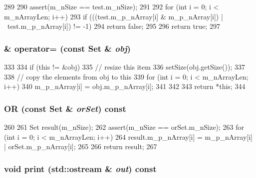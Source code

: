 \begin{DoxyCode}
289 {
290     assert(m_nSize == test.m_nSize);
291 
292     for (int i = 0; i < m_nArrayLen; i++)
293         if (((test.m_p_nArray[i] & m_p_nArray[i]) | ~test.m_p_nArray[i]) != -1)
294             return false;
295 
296     return true;
297 }
\end{DoxyCode}
\hypertarget{classSet_a274b72d7f852e6eb0e416c1d2e00c1ee}{
\subsubsection[{operator=}]{ \& operator= (const {\bf Set} \& {\em obj})}}
\label{classSet_a274b72d7f852e6eb0e416c1d2e00c1ee}



\begin{DoxyCode}
333 {
334     if (this != &obj) {
335         // resize this item
336         setSize(obj.getSize());
337 
338         // copy the elements from obj to this
339         for (int i = 0; i < m_nArrayLen; i++)
340             m_p_nArray[i] = obj.m_p_nArray[i];
341     }
342 
343     return *this;
344 }
\end{DoxyCode}
\hypertarget{classSet_aaba9e97960a8c78f28a2fe8f28e5b37a}{
\subsubsection[{OR}]{ OR (const {\bf Set} \& {\em orSet}) const}}
\label{classSet_aaba9e97960a8c78f28a2fe8f28e5b37a}



\begin{DoxyCode}
260 {
261     Set result(m_nSize);
262     assert(m_nSize == orSet.m_nSize);
263     for (int i = 0; i < m_nArrayLen; i++)
264         result.m_p_nArray[i] = m_p_nArray[i] | orSet.m_p_nArray[i];
265 
266     return result;
267 }
\end{DoxyCode}
\hypertarget{classSet_ac55fe386a101fbae38c716067c9966a0}{
\subsubsection[{print}]{\setlength{\rightskip}{0pt plus 5cm}void print (std::ostream \& {\em out}) const}}
\label{classSet_ac55fe386a101fbae38c716067c9966a0}



